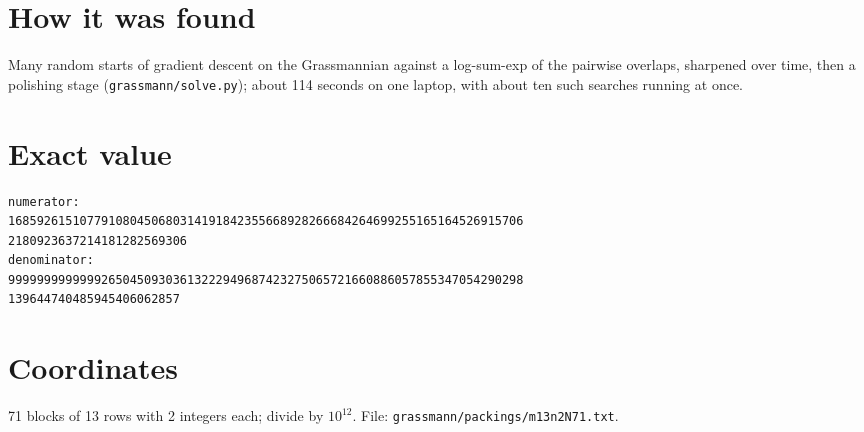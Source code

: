 \documentclass[11pt,a4paper]{article}
\begin{document}
\section{How it was found}
Many random starts of gradient descent on the Grassmannian against a log-sum-exp of the pairwise overlaps, sharpened over time, then a polishing stage (\texttt{grassmann/solve.py}); about 114 seconds on one laptop, with about ten such searches running at once.


\appendix
\section{Exact value}
{\small
\begin{verbatim}
numerator:
168592615107791080450680314191842355668928266684264699255165164526915706
2180923637214181282569306
denominator:
999999999999926504509303613222949687423275065721660886057855347054290298
139644740485945406062857
\end{verbatim}}

\section{Coordinates}
71 blocks of 13 rows with 2 integers each; divide by $10^{12}$. File: \texttt{grassmann/packings/m13n2N71.txt}.
{\tiny
\begin{multicols}{4}
\end{multicols}}
\end{document}
